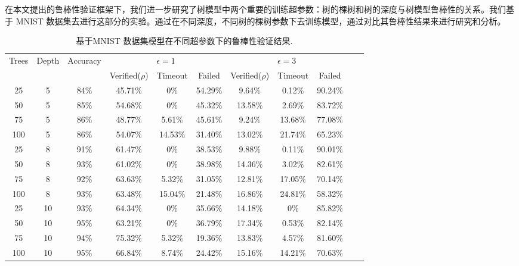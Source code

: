 在本文提出的鲁棒性验证框架下，我们进一步研究了树模型中两个重要的训练超参数：树的棵树和树的深度与树模型鲁棒性的关系。我们基于 MNIST 数据集去进行这部分的实验。通过在不同深度，不同树的棵树参数下去训练模型，通过对比其鲁棒性结果来进行研究和分析。
\begin{table}
\caption{基于MNIST 数据集模型在不同超参数下的鲁棒性验证结果.}
\begin{center}
\begin{tabular}{|c|c|c|c|c|c|c|c|c|c|c|}
\hline 
\multirow{2}{*}{Trees} & \multirow{2}{*}{Depth} & \multirow{2}{*}{Accuracy} & \multicolumn{3}{c|}{$\epsilon=1$} &  \multicolumn{3}{c|}{$\epsilon=3$} \\ \cline{4-9}
& & & Verified($\rho$) & Timeout & Failed & Verified($\rho$) & Timeout & Failed \\
\hline
25 & 5& 84$\%$&45.71$\%$ &0$\%$ &54.29$\%$& 9.64$\%$& 0.12$\%$& 90.24$\%$ \\
\hline
50& 5& 85$\%$&54.68$\%$ &0$\%$ &45.32$\%$ & 13.58$\%$&2.69$\%$ & 83.72$\%$ \\
\hline
75& 5& 86$\%$& 48.77$\%$&5.61$\%$ &45.61$\%$ &9.24$\%$ & 13.68$\%$&77.08$\%$  \\
\hline
100&5 & 86$\%$& 54.07$\%$& 14.53$\%$& 31.40$\%$&13.02$\%$ &21.74$\%$ &65.23$\%$  \\
\hline
25& 8& 91$\%$& 61.47$\%$& 0$\%$& 38.53$\%$&9.88$\%$ &0.11$\%$ &90.01$\%$  \\
\hline
50& 8& 93$\%$& 61.02$\%$&0$\%$ &38.98$\%$ &14.36$\%$ &3.02$\%$ &82.61$\%$  \\
\hline
75& 8& 92$\%$& 63.63$\%$&5.32$\%$ &31.05$\%$ &12.81$\%$ &17.05$\%$ &70.14$\%$  \\
\hline
100& 8& 93$\%$& 63.48$\%$&15.04$\%$ &21.48$\%$ & 16.86$\%$&24.81$\%$ &58.32$\%$  \\
\hline
25&10 & 93$\%$& 64.34$\%$& 0$\%$& 35.66$\%$& 14.18$\%$& 0$\%$&85.82$\%$  \\
\hline
50& 10& 95$\%$& 63.21$\%$&0$\%$ & 36.79$\%$&17.34$\%$ &0.53$\%$ &82.14$\%$  \\
\hline
75& 10& 94$\%$& 75.32$\%$&5.32$\%$ & 19.36$\%$& 13.83$\%$& 4.57$\%$&81.60$\%$  \\
\hline
100& 10& 95$\%$& 66.84$\%$& 8.74$\%$& 24.42$\%$&15.16$\%$ &14.21$\%$ &70.63$\%$  \\
\hline
\end{tabular}
\label{tab1}
\end{center}
\end{table}

